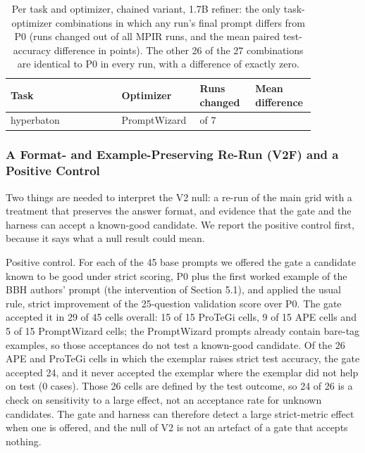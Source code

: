\documentclass{ieeeaccess}
\begin{document}
\begin{table}[htbp]
\centering
\small
\caption{Per task and optimizer, chained variant, 1.7B refiner: the only task-optimizer combinations in which any run's final prompt differs from P0 (runs changed out of all MPIR runs, and the mean paired test-accuracy difference in points). The other 26 of the 27 combinations are identical to P0 in every run, with a difference of exactly zero.}
\begin{tabular}{>{\raggedright\arraybackslash}p{0.344\linewidth}>{\raggedright\arraybackslash}p{0.189\linewidth}>{\raggedright\arraybackslash}p{0.172\linewidth}>{\raggedright\arraybackslash}p{0.155\linewidth}}
\toprule
\textbf{Task} & \textbf{Optimizer} & \textbf{Runs changed} & \textbf{Mean difference} \\
\midrule
hyperbaton & PromptWizard & 1 of 7 & -0.6 \\
\bottomrule
\end{tabular}
\end{table}

\subsubsection{A Format- and Example-Preserving Re-Run (V2F) and a Positive Control}

Two things are needed to interpret the V2 null: a re-run of the main grid with a treatment that preserves the answer format, and evidence that the gate and the harness can accept a known-good candidate. We report the positive control first, because it says what a null result could mean.

Positive control. For each of the 45 base prompts we offered the gate a candidate known to be good under strict scoring, P0 plus the first worked example of the BBH authors' prompt (the intervention of Section 5.1), and applied the usual rule, strict improvement of the 25-question validation score over P0. The gate accepted it in 29 of 45 cells overall: 15 of 15 ProTeGi cells, 9 of 15 APE cells and 5 of 15 PromptWizard cells; the PromptWizard prompts already contain bare-tag examples, so those acceptances do not test a known-good candidate. Of the 26 APE and ProTeGi cells in which the exemplar raises strict test accuracy, the gate accepted 24, and it never accepted the exemplar where the exemplar did not help on test (0 cases). Those 26 cells are defined by the test outcome, so 24 of 26 is a check on sensitivity to a large effect, not an acceptance rate for unknown candidates. The gate and harness can therefore detect a large strict-metric effect when one is offered, and the null of V2 is not an artefact of a gate that accepts nothing.
\end{document}
